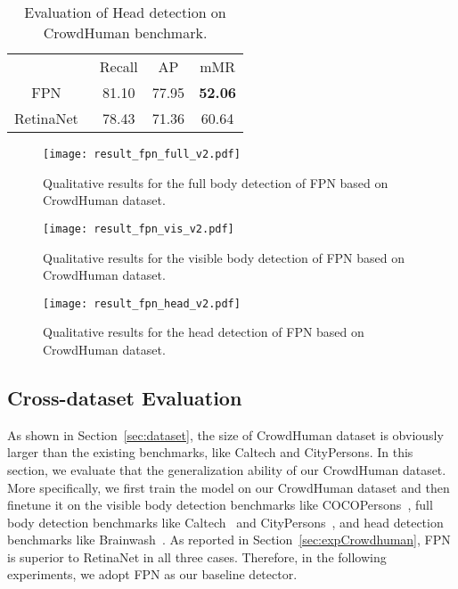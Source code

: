 \documentclass[10pt,twocolumn,letterpaper]{article}
\begin{document}
\setlength{\tabcolsep}{4pt}
\begin{table}
\begin{center}
\caption{Evaluation of Head detection on CrowdHuman benchmark.}
\label{table:evalHead}
\begin{tabular}{cccc}
\hline\noalign{\smallskip}
{} & Recall & AP & mMR\\
\noalign{\smallskip}
\hline
\noalign{\smallskip}
FPN~\cite{lin2017feature}  & {81.10} & {77.95} & {\textbf{52.06}}\\
RetinaNet~\cite{lin2017focal} & {78.43} & {71.36} & {60.64}\\
\hline
\end{tabular}
\end{center}
\end{table}
\setlength{\tabcolsep}{1.4pt}


\begin{figure*}
\centering
\texttt{[image: result\_fpn\_full\_v2.pdf]}
\caption{Qualitative results for the full body detection of FPN based on CrowdHuman dataset.}
\label{fig:result_fpn_full}
\end{figure*}

\begin{figure*}
\centering
\texttt{[image: result\_fpn\_vis\_v2.pdf]}
\caption{Qualitative results for the visible body detection of FPN based on CrowdHuman dataset.}
\label{fig:result_fpn_vis}
\end{figure*}

\begin{figure*}
\centering
\texttt{[image: result\_fpn\_head\_v2.pdf]}
\caption{Qualitative results for the head detection of FPN based on CrowdHuman dataset.}
\label{fig:result_fpn_head}
\end{figure*}

\subsection{Cross-dataset Evaluation}\label{exp:crossdataset}

As shown in Section~\ref{sec:dataset}, the size of CrowdHuman dataset is obviously larger than the existing benchmarks, like Caltech and CityPersons. In this section, we evaluate that the generalization ability of our CrowdHuman dataset. More specifically, we first train the model on our CrowdHuman dataset and then finetune it on the visible body detection benchmarks like COCOPersons~\cite{lin2014microsoft}, full body detection benchmarks like Caltech~\cite{dollar2009pedestrian} and CityPersons~\cite{zhang2017citypersons}, and head detection benchmarks like Brainwash~\cite{stewart2016end}. As reported in Section~\ref{sec:expCrowdhuman}, FPN is superior to RetinaNet in all three cases. Therefore, in the following experiments, we adopt FPN as our baseline detector.
\end{document}

